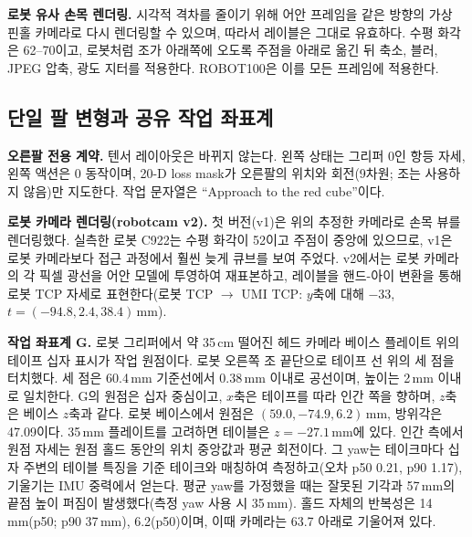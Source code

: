\documentclass[conference,10pt]{IEEEtran}
\newcommand{\mm}{\,mm\xspace}
\begin{document}
\textbf{로봇 유사 손목 렌더링.} 시각적 격차를 줄이기 위해 어안 프레임을 같은 방향의 가상 핀홀 카메라로 다시 렌더링할 수 있으며,
따라서 레이블은 그대로 유효하다. 수평 화각은 62--70\textdegree{}이고, 로봇처럼 조가 아래쪽에 오도록 주점을 아래로 옮긴 뒤 축소,
블러, JPEG 압축, 광도 지터를 적용한다. ROBOT100은 이를 모든 프레임에 적용한다.

\subsection{단일 팔 변형과 공유 작업 좌표계}
\textbf{오른팔 전용 계약.} 텐서 레이아웃은 바뀌지 않는다. 왼쪽 상태는 그리퍼 0인 항등 자세, 왼쪽 액션은 0 동작이며, 20-D loss mask가
오른팔의 위치와 회전(9차원; 조는 사용하지 않음)만 지도한다. 작업 문자열은 ``Approach to the red cube''이다.

\textbf{로봇 카메라 렌더링(robotcam v2).} 첫 버전(v1)은 위의 추정한 카메라로 손목 뷰를 렌더링했다. 실측한 로봇 C922는 수평 화각이
52\textdegree{}이고 주점이 중앙에 있으므로, v1은 로봇 카메라보다 접근 과정에서 훨씬 늦게 큐브를 보여 주었다. v2에서는 로봇 카메라의
각 픽셀 광선을 어안 모델에 투영하여 재표본하고, 레이블을 핸드-아이 변환을 통해 로봇 TCP 자세로 표현한다(로봇 TCP $\to$ UMI TCP: $y$축에
대해 $-33$\textdegree, $t=(-94.8, 2.4, 38.4)$\mm).

\textbf{작업 좌표계 G.} 로봇 그리퍼에서 약 35\,cm 떨어진 헤드 카메라 베이스 플레이트 위의 테이프 십자 표시가 작업 원점이다. 로봇
오른쪽 조 끝단으로 테이프 선 위의 세 점을 터치했다. 세 점은 60.4\mm{} 기준선에서 0.38\mm{} 이내로 공선이며, 높이는 2\mm{} 이내로
일치한다. G의 원점은 십자 중심이고, $x$축은 테이프를 따라 인간 쪽을 향하며, $z$축은 베이스 $z$축과 같다. 로봇 베이스에서 원점은
$(59.0, -74.9, 6.2)$\mm, 방위각은 47.09\textdegree{}이다. 35\mm{} 플레이트를 고려하면 테이블은 $z=-27.1$\mm{}에 있다. 인간 측에서
원점 자세는 원점 홀드 동안의 위치 중앙값과 평균 회전이다. 그 yaw는 테이크마다 십자 주변의 테이블 특징을 기준 테이크와 매칭하여
측정하고(오차 p50 0.21\textdegree, p90 1.17\textdegree), 기울기는 IMU 중력에서 얻는다. 평균 yaw를 가정했을 때는 잘못된 기각과
57\mm{}의 끝점 높이 퍼짐이 발생했다(측정 yaw 사용 시 35\mm). 홀드 자체의 반복성은 14\mm(p50; p90 37\mm), 6.2\textdegree(p50)이며,
이때 카메라는 63.7\textdegree{} 아래로 기울어져 있다.
\end{document}
